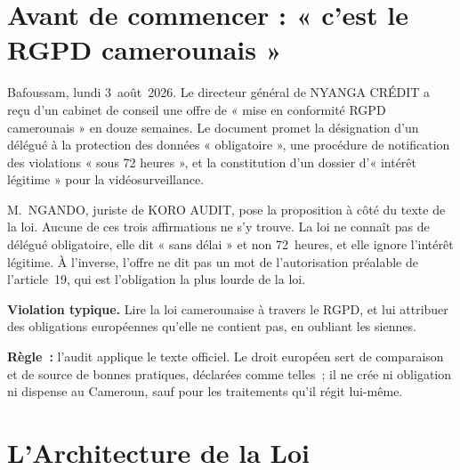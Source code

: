 \bigskip

\section*{Avant de commencer : « c'est le RGPD camerounais »}

Bafoussam, lundi 3~août~2026. Le directeur général de NYANGA CRÉDIT a reçu
d'un cabinet de conseil une offre de « mise en conformité RGPD
camerounais » en douze semaines. Le document promet la désignation d'un
délégué à la protection des données « obligatoire », une procédure de
notification des violations « sous 72 heures », et la constitution d'un
dossier d'« intérêt légitime » pour la vidéosurveillance.

M.~NGANDO, juriste de KORO AUDIT, pose la proposition à côté du texte de la
loi. Aucune de ces trois affirmations ne s'y trouve. La loi ne connaît pas
de délégué obligatoire, elle dit « sans délai » et non 72~heures, et elle
ignore l'intérêt légitime. À l'inverse, l'offre ne dit pas un mot de
l'autorisation préalable de l'article~19, qui est l'obligation la plus
lourde de la loi.

\begin{boxalert}
\textbf{Violation typique.} Lire la loi camerounaise à travers le RGPD, et
lui attribuer des obligations européennes qu'elle ne contient pas, en
oubliant les siennes.

\smallskip
\textbf{Règle~:} l'audit applique le texte officiel. Le droit européen sert
de comparaison et de source de bonnes pratiques, déclarées comme telles~;
il ne crée ni obligation ni dispense au Cameroun, sauf pour les traitements
qu'il régit lui-même.
\end{boxalert}

\section{L'Architecture de la Loi}
\label{sec:c08-architecture}

